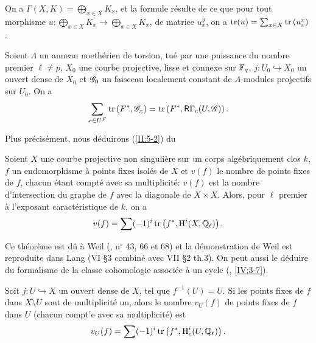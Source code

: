 \documentclass[oneside]{book}
\begin{document}
On a $\Gamma(X,K)=\bigoplus_{x\in X} K_x$, et la formule r\'esulte de ce que 
pour tout morphisme $u:\bigoplus_{x\in X} K_x\to \bigoplus_{x\in X} K_x$, de 
matrice $u_x^y$, on a $\operatorname{tr}(u)=\sum_{x\in X} \operatorname{tr}\left(u_x^x\right)$. 





\begin{lemma_}\label{II:5-2}
Soient $\Lambda$ un anneau noeth\'erien de torsion, tu\'e par une puissance du 
nombre premier $\ell\ne p$, $X_0$ une courbe projective, lisse et connexe sur 
$\mathbb{F}_q$, $j:U_0\hookrightarrow X_0$ un ouvert dense de $X_0$ et $\mathscr{G}_0$ un 
faisceau localement constant de $\Lambda$-modules projectifs sur $U_0$. On a 
\[
  \sum_{x\in U^F} \operatorname{tr}\left(F^*,\mathscr{G}_x\right) = \operatorname{tr}\left(F^*,\mathsf{R}\Gamma_c(U,\mathscr{G})\right) \text{.}
\]
\end{lemma_}

Plus pr\'ecis\'ement, nous d\'eduirons (\ref{II:5-2}) du 





\begin{theorem_}\label{II:5-3}
Soient $X$ une courbe projective non singuli\`ere sur un corps alg\'ebriquement 
clos $k$, $f$ un endomorphisme \`a points fixes isol\'es de $X$ et $v(f)$ le 
nombre de points fixes de $f$, chacun \'etant compt\'e avec sa multiplicit\'e: 
$v(f)$ est la nombre d'intersection du graphe de $f$ avec la diagonale de 
$X\times X$. Alors, pour $\ell$ premier \`a l'exposant caract\'eristique de $k$, 
on a 
\[
  v(f) = \sum (-1)^i \operatorname{tr}\left(f^*,\operatorname{H}^i(X,\mathbb{Q}_\ell)\right) \text{.}
\]
\end{theorem_}

Ce th\'eor\`eme est d\^u \`a Weil (\cite{II:4}, n$^\circ$ 43, 66 et 68) et la 
d\'emonstration de Weil est reproduite dans Lang \cite{II:3} (VI \S3 combin\'e 
avec VII \S2 th.3). On peut aussi le d\'eduire du formalisme de la classe 
cohomologie associ\'ee \`a un cycle (, \ref{IV:3-7}). 





\begin{corollary_}\label{II:5-4}
Soit $j:U\hookrightarrow X$ un ouvert dense de $X$, tel que $f^{-1}(U)=U$. Si 
les points fixes de $f$ dans $X\setminus U$ sont de multiplicit\'e un, alors le 
nombre $v_U(f)$ de points fixes de $f$ dans $U$ (chacun compt'e avec sa 
multiplicit\'e) est 
\[
  v_U(f) = \sum (-1)^i \operatorname{tr}\left(f^*,\operatorname{H}_c^i(U,\mathbb{Q}_\ell)\right) \text{.}
\]
\end{corollary_}
\end{document}
